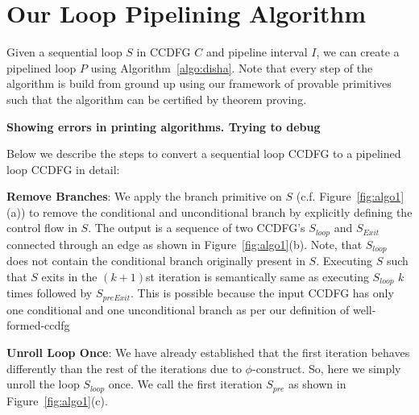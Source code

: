 \section{Our Loop Pipelining Algorithm}
Given a sequential loop $S$ in CCDFG $C$ and pipeline interval $I$, we can create a pipelined loop $P$ using Algorithm~\ref{algo:disha}. Note that every step of the algorithm is build from ground up using our framework of provable primitives such that the algorithm can be certified by theorem proving.

{\bf Showing errors in printing algorithms. Trying to debug}

%

Below we describe the steps to convert a sequential loop CCDFG to a pipelined loop CCDFG in detail:
 
{\bf Remove Branches}: We apply the branch primitive on $S$ (c.f. Figure~\ref{fig:algo1}(a)) to remove the conditional and unconditional branch by explicitly defining the control flow in $S$. The output is a sequence of two CCDFG's $S_{loop}$ and $S_{Exit}$ connected through an edge as shown in Figure~\ref{fig:algo1}(b).
Note, that $S_{loop}$ does not contain the conditional branch originally present in $S$.
Executing $S$ such that $S$ exits in the $(k+1)$st iteration is semantically same as executing $S_{loop}$ $k$ times
followed by $S_{preExit}$. This is possible because the input CCDFG has only one conditional and one unconditional branch as per our definition of well-formed-ccdfg 

{\bf Unroll Loop Once}: We have already established that the first iteration behaves differently than the rest of the
iterations due to $\phi$-construct. So, here we simply unroll the loop $S_{loop}$ once. We call the first iteration
$S_{pre}$ as shown in Figure~\ref{fig:algo1}(c).

